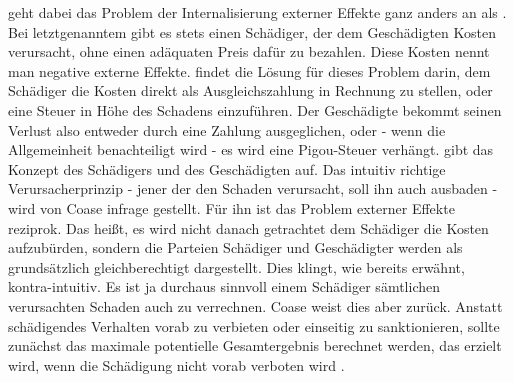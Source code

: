 \textcite{Coase1960} geht dabei das Problem der Internalisierung externer Effekte ganz anders an als \textcite{Pigou1920}. Bei letztgenanntem gibt es stets einen Schädiger, der dem Geschädigten Kosten verursacht, ohne einen adäquaten Preis dafür zu bezahlen. Diese Kosten nennt man negative externe Effekte. \textcite{Pigou1920} findet die Lösung für dieses Problem darin, dem Schädiger die Kosten direkt als Ausgleichszahlung in Rechnung zu stellen, oder eine Steuer in Höhe des Schadens einzuführen. Der Geschädigte bekommt seinen Verlust also entweder durch eine Zahlung ausgeglichen, oder - wenn die Allgemeinheit benachteiligt wird  - es wird eine Pigou-Steuer verhängt. \textcite{Coase1960} gibt das Konzept des Schädigers und des Geschädigten auf. Das intuitiv richtige Verursacherprinzip - jener der den Schaden verursacht, soll ihn auch ausbaden - wird von Coase infrage gestellt. Für ihn ist das Problem externer Effekte reziprok. Das heißt, es wird nicht danach getrachtet dem Schädiger die Kosten aufzubürden, sondern die Parteien Schädiger und Geschädigter werden als grundsätzlich gleichberechtigt dargestellt. Dies klingt, wie bereits erwähnt, kontra-intuitiv. Es ist ja durchaus sinnvoll einem Schädiger sämtlichen verursachten Schaden auch zu verrechnen. Coase weist dies aber zurück. Anstatt schädigendes Verhalten vorab zu verbieten oder einseitig zu sanktionieren, sollte zunächst das maximale potentielle Gesamtergebnis berechnet werden, das erzielt wird, wenn die Schädigung nicht vorab verboten wird \parencite[S. 293]{Erlei2016}. 

